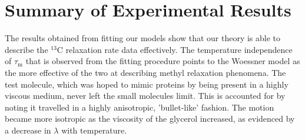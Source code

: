 \section{Summary of Experimental Results}
The results obtained from fitting our models show that our theory is able to describe the $^{13}$C relaxation rate data effectively. The temperature independence of $\tau_{\text{m}}$ that is observed from the fitting procedure points to the Woessner model as the more effective of the two at describing methyl relaxation phenomena. The test molecule, which was hoped to mimic proteins by being present in a highly viscous medium, never left the small molecules limit. This is accounted for by noting it travelled in a highly anisotropic, 'bullet-like' fashion. The motion became more isotropic as the viscosity of the glycerol increased, as evidenced by a decrease in $\lambda$ with temperature.
